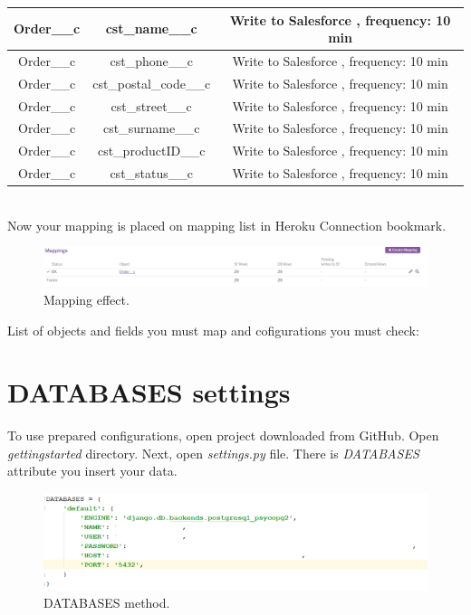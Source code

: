 \documentclass[12pt,a4paper]{article}
\begin{document}
\begin{enumerate}
\begin{tabular}{|c|c|c|}
	\hline			
	Order\_\_c&cst\_name\_\_c&Write to Salesforce , frequency: 10 min\\ 
	\hline	
	Order\_\_c&cst\_phone\_\_c&Write to Salesforce , frequency: 10 min\\ 
	\hline	
	Order\_\_c&cst\_postal\_code\_\_c&Write to Salesforce , frequency: 10 min\\ 
	\hline	
	Order\_\_c&cst\_street\_\_c&Write to Salesforce , frequency: 10 min\\ 
	\hline		
	Order\_\_c&cst\_surname\_\_c&Write to Salesforce , frequency: 10 min\\ 
	\hline	
	Order\_\_c&cst\_productID\_\_c&Write to Salesforce , frequency: 10 min\\ 
	\hline	
	Order\_\_c&cst\_status\_\_c&Write to Salesforce , frequency: 10 min\\ 
	\hline						
	
\end{tabular}\\

Now your mapping is placed on mapping list in Heroku Connection bookmark. 

\begin{figure}[H]
	\centering
	\includegraphics[width=1\textwidth]{images/connect10.PNG}
	\caption{Mapping effect.}
	\label{fig:conj}
\end{figure}

\end{enumerate} 

List of objects and fields you must map and cofigurations you must check:\\


\section{DATABASES settings}
To use prepared configurations, open project downloaded from GitHub. Open \textit{gettingstarted} directory. Next, open \textit{settings.py} file. There is \textit{DATABASES} attribute you insert your data.  

\begin{figure}[H]
	\centering
	\includegraphics[width=1\textwidth]{images/databases.PNG}
	\caption{DATABASES method.}
	\label{fig:data}
\end{figure}
\end{document}
